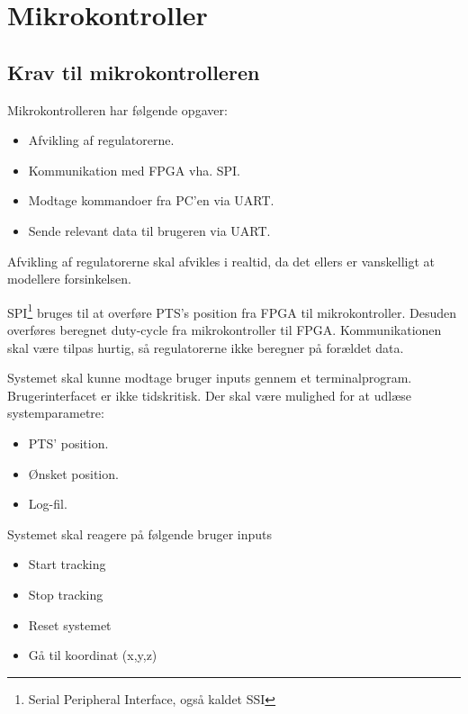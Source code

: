 \section{Mikrokontroller}
\label{sec:mikrokontroller}
\subsection{Krav til mikrokontrolleren}
Mikrokontrolleren har følgende opgaver: 
\begin{itemize}
	\item Afvikling af regulatorerne.
	\item Kommunikation med FPGA vha. SPI.
	\item Modtage kommandoer fra PC'en via UART.
	\item Sende relevant data til brugeren via UART.
\end{itemize}

Afvikling af regulatorerne skal afvikles i realtid, da det ellers er vanskelligt at modellere forsinkelsen. 


SPI\footnote{Serial Peripheral Interface, også kaldet SSI} bruges til at overføre PTS's position fra FPGA til mikrokontroller. Desuden overføres beregnet duty-cycle fra mikrokontroller til FPGA. Kommunikationen skal være tilpas hurtig, så regulatorerne ikke beregner på forældet data. 

Systemet skal kunne modtage bruger inputs gennem et terminalprogram. Brugerinterfacet er ikke tidskritisk. Der skal være mulighed for at udlæse systemparametre:

\begin{itemize}
	\item PTS' position. 
	\item Ønsket position. 
	\item Log-fil.
\end{itemize}

Systemet skal reagere på følgende bruger inputs


\begin{itemize}
	\item Start tracking
	\item Stop tracking
	\item Reset systemet
	\item Gå til koordinat (x,y,z)
\end{itemize}


